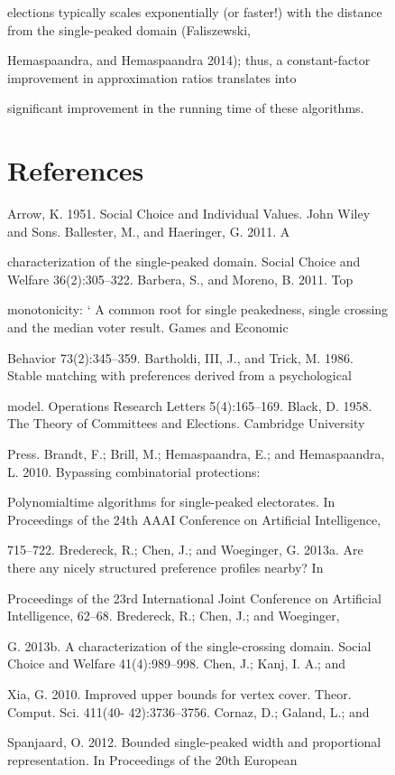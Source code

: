 \documentclass[12pt, a4paper]{report}
\begin{document}
\begin{figure}[ht!]
elections typically scales exponentially (or faster!) with the distance from the single-peaked domain (Faliszewski, 

Hemaspaandra, and Hemaspaandra 2014); thus, a constant-factor improvement in approximation ratios translates into 

significant improvement in the running time of these algorithms.

\section*{References}
Arrow, K. 1951. Social Choice and Individual Values. John Wiley and Sons. Ballester, M., and Haeringer, G. 2011. A 

characterization of the single-peaked domain. Social Choice and Welfare 36(2):305–322. Barbera, S., and Moreno, B. 2011. Top 

monotonicity: ` A common root for single peakedness, single crossing and the median voter result. Games and Economic 

Behavior 73(2):345–359. Bartholdi, III, J., and Trick, M. 1986. Stable matching with preferences derived from a psychological 

model. Operations Research Letters 5(4):165–169. Black, D. 1958. The Theory of Committees and Elections. Cambridge University 

Press. Brandt, F.; Brill, M.; Hemaspaandra, E.; and Hemaspaandra, L. 2010. Bypassing combinatorial protections: 

Polynomialtime algorithms for single-peaked electorates. In Proceedings of the 24th AAAI Conference on Artificial Intelligence, 

715–722. Bredereck, R.; Chen, J.; and Woeginger, G. 2013a. Are there any nicely structured preference profiles nearby? In 

Proceedings of the 23rd International Joint Conference on Artificial Intelligence, 62–68. Bredereck, R.; Chen, J.; and Woeginger, 

G. 2013b. A characterization of the single-crossing domain. Social Choice and Welfare 41(4):989–998. Chen, J.; Kanj, I. A.; and 

Xia, G. 2010. Improved upper bounds for vertex cover. Theor. Comput. Sci. 411(40- 42):3736–3756. Cornaz, D.; Galand, L.; and 

Spanjaard, O. 2012. Bounded single-peaked width and proportional representation. In Proceedings of the 20th European 


\end{figure}
\end{document}
